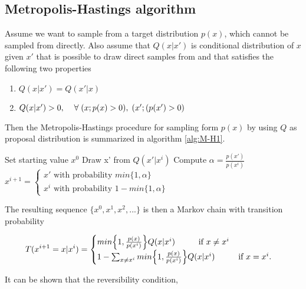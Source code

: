 \subsection{Metropolis-Hastings algorithm}

Assume we want to sample from a target distribution $p(x)$, which cannot be sampled from directly. Also assume that $Q(x|x')$ is conditional distribution of $x$ given $x'$ that is possible to draw direct samples from and that satisfies the following two properties

\begin{enumerate}
    \item $Q(x|x') = Q(x'|x)$
    \item $Q(x|x')>0,   \hspace{4mm} \forall \; (x; p(x)>0), \; (x';(p(x')>0)$
\end{enumerate}

Then the Metropolis-Hastings procedure for sampling form $p(x)$ by using $Q$ as proposal distribution is summarized in algorithm \ref{alg:M-H1}.

\begin{algorithm}
\caption{}\label{alg:M-H1}
\begin{algorithmic}
\State Set starting value $x^0$
\State Draw x' from $Q(x'|x^i)$
\State Compute $\alpha = \frac{p(x')}{p(x^i)}$
\State $x^{i+1} = \begin{cases} x' \text{ with probability } min\{ 1, \alpha \}\\ x^i \text{ with probability } 1-min\{ 1, \alpha \}
\end{cases}$
\EndFor
\end{algorithmic}
\end{algorithm}

The resulting sequence $\{  x^0, x^1, x^2,... \}$ is then a Markov chain with transition probability

\begin{equation}
    T(x^{i+1} = x|x^i) = \begin{cases} min \Big \{ 1, \frac{p(x)}{p(x^i)} \Big \} Q(x|x^i) \hspace{1cm} \text{if } x\neq x^i\\
    1-\sum_{x \neq x^i} min \Big \{ 1, \frac{p(x)}{p(x^i)} \Big \} Q(x|x^i) \hspace{1 cm} \text{if } x=x^i.
\end{cases}
\end{equation}

It can be shown that the reversibility condition, 


